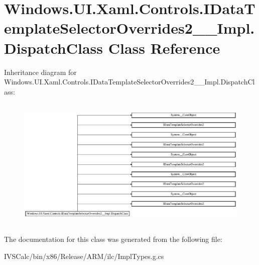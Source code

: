 \hypertarget{class_windows_1_1_u_i_1_1_xaml_1_1_controls_1_1_i_data_template_selector_overrides2_____impl_1_1_dispatch_class}{}\section{Windows.\+U\+I.\+Xaml.\+Controls.\+I\+Data\+Template\+Selector\+Overrides2\+\_\+\+\_\+\+Impl.\+Dispatch\+Class Class Reference}
\label{class_windows_1_1_u_i_1_1_xaml_1_1_controls_1_1_i_data_template_selector_overrides2_____impl_1_1_dispatch_class}
Inheritance diagram for Windows.\+U\+I.\+Xaml.\+Controls.\+I\+Data\+Template\+Selector\+Overrides2\+\_\+\+\_\+\+Impl.\+Dispatch\+Class\+:\begin{figure}[H]
\begin{center}
\leavevmode
\includegraphics[height=6.390041cm]{class_windows_1_1_u_i_1_1_xaml_1_1_controls_1_1_i_data_template_selector_overrides2_____impl_1_1_dispatch_class}
\end{center}
\end{figure}


The documentation for this class was generated from the following file\+:\begin{DoxyCompactItemize}
\item 
I\+V\+S\+Calc/bin/x86/\+Release/\+A\+R\+M/ilc/Impl\+Types.\+g.\+cs\end{DoxyCompactItemize}

